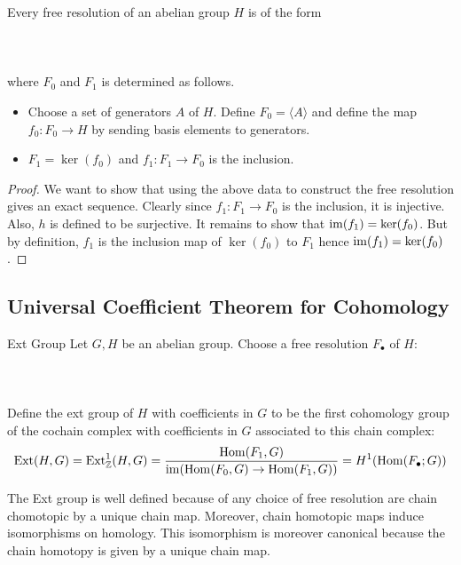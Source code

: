 \documentclass[a4paper]{article}
\begin{document}
\begin{lmm}{}{} Every free resolution of an abelian group $H$ is of the form \\~\\
\\~\\
where $F_0$ and $F_1$ is determined as follows. 
\begin{itemize}
\item Choose a set of generators $A$ of $H$. Define $F_0=\langle A\rangle$ and define the map $f_0:F_0\to H$ by sending basis elements to generators. 
\item $F_1=\ker(f_0)$ and $f_1:F_1\to F_0$ is the inclusion. 
\end{itemize} \tcbline
\begin{proof}
We want to show that using the above data to construct the free resolution gives an exact sequence. Clearly since $f_1:F_1\to F_0$ is the inclusion, it is injective. Also, $h$ is defined to be surjective. It remains to show that $\operatorname{im}(f_1)=\ker(f_0)$. But by definition, $f_1$ is the inclusion map of $\ker(f_0)$ to $F_1$ hence $\operatorname{im}(f_1)=\ker(f_0)$. 
\end{proof}
\end{lmm}

\subsection{Universal Coefficient Theorem for Cohomology}
\begin{defn}{Ext Group}{} Let $G,H$ be an abelian group. Choose a free resolution $F_\bullet$ of $H$: \\~\\
\\~\\
Define the ext group of $H$ with coefficients in $G$ to be the first cohomology group of the cochain complex with coefficients in $G$ associated to this chain complex: $$\text{Ext}(H,G)=\text{Ext}_{\mathbb{Z}}^1(H,G)=\frac{\operatorname{Hom}(F_1,G)}{\operatorname{im}(\operatorname{Hom}(F_0,G)\to\operatorname{Hom}(F_1,G))}=H^1(\operatorname{Hom}(F_\bullet;G))$$
\end{defn}

The Ext group is well defined because of any choice of free resolution are chain chomotopic by a unique chain map. Moreover, chain homotopic maps induce isomorphisms on homology. This isomorphism is moreover canonical because the chain homotopy is given by a unique chain map. \\
\end{document}
